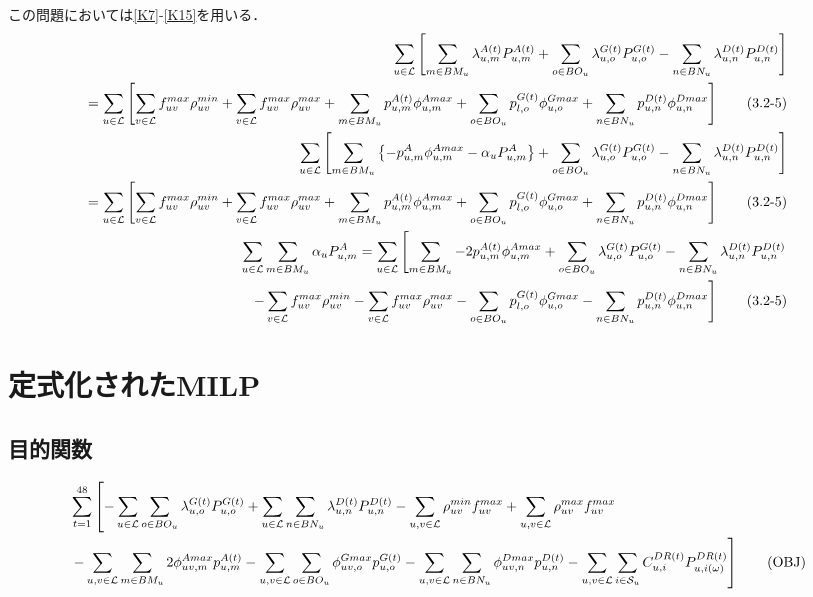 \documentclass[a4j,10.5pt]{jarticle}
\begin{document}
この問題においては\ref{K7}-\ref{K15}を用いる．
\begin{align}
\sum_{u\in \mathcal{L}}\left[\sum_{m\in BM_u}\lambda^{A(t)}_{u,m}P^{A(t)}_{u,m}+\sum_{o\in BO_u}\lambda^{G(t)}_{u,o}P^{G(t)}_{u,o}-\sum_{n\in BN_u}\lambda^{D(t)}_{u,n}P^{D(t)}_{u,n}\right] \notag\\
=\sum_{u\in \mathcal{L}}\left[\sum_{v\in \mathcal{L}}f_{uv}^{max}\rho_{uv}^{min}+\sum_{v\in \mathcal{L}}f_{uv}^{max}\rho_{uv}^{max}+\sum_{m\in BM_u}p_{u,m}^{A(t)}\phi_{u,m}^{Amax}+\sum_{o\in BO_u}p_{l,o}^{G(t)}\phi_{u,o}^{Gmax}+\sum_{n\in BN_u}p_{u,n}^{D(t)}\phi_{u,n}^{Dmax}\right] \tag{3.2-5}\label{3.2-5}\\
\sum_{u\in \mathcal{L}}\left[\sum_{m\in BM_u}\left\{-p_{u,m}^A\phi_{u,m}^{Amax}-\alpha_uP_{u,m}^A\right\}+\sum_{o\in BO_u}\lambda^{G(t)}_{u,o}P^{G(t)}_{u,o}-\sum_{n\in BN_u}\lambda^{D(t)}_{u,n}P^{D(t)}_{u,n}\right] \notag\\
=\sum_{u\in \mathcal{L}}\left[\sum_{v\in \mathcal{L}}f_{uv}^{max}\rho_{uv}^{min}+\sum_{v\in \mathcal{L}}f_{uv}^{max}\rho_{uv}^{max}+\sum_{m\in BM_u}p_{u,m}^{A(t)}\phi_{u,m}^{Amax}+\sum_{o\in BO_u}p_{l,o}^{G(t)}\phi_{u,o}^{Gmax}+\sum_{n\in BN_u}p_{u,n}^{D(t)}\phi_{u,n}^{Dmax}\right] \tag{3.2-5}\label{3.2-5}\\
\sum_{u\in \mathcal{L}}\sum_{m\in BM_u}\alpha_uP_{u,m}^A=\sum_{u\in \mathcal{L}}\left[\sum_{m\in BM_u}-2p_{u,m}^{A(t)}\phi_{u,m}^{Amax}+\sum_{o\in BO_u}\lambda^{G(t)}_{u,o}P^{G(t)}_{u,o}-\sum_{n\in BN_u}\lambda^{D(t)}_{u,n}P^{D(t)}_{u,n}\right.\notag\\
\left.-\sum_{v\in \mathcal{L}}f_{uv}^{max}\rho_{uv}^{min}-\sum_{v\in \mathcal{L}}f_{uv}^{max}\rho_{uv}^{max}-\sum_{o\in BO_u}p_{l,o}^{G(t)}\phi_{u,o}^{Gmax}-\sum_{n\in BN_u}p_{u,n}^{D(t)}\phi_{u,n}^{Dmax}\right] \tag{3.2-5}\label{3.2-5}
\end{align}

\newpage
\section{定式化されたMILP}
\subsection{目的関数}
\begin{align}
&\sum_{t=1}^{48} \left[-\sum_{u\in \mathcal{L}} \sum_{o\in BO_u}\lambda_{u,o}^{G(t)}P_{u,o}^{G(t)}+\sum_{u\in \mathcal{L}} \sum_{n\in BN_u}\lambda_{u,n}^{D(t)}P_{u,n}^{D(t)}-\sum_{u,v\in \mathcal{L}}\rho_{uv}^{min}f_{uv}^{max}+\sum_{u,v\in \mathcal{L}}\rho_{uv}^{max}f_{uv}^{max}
\notag \right. \\
&\left.-\sum_{u,v\in \mathcal{L}} \sum_{m\in BM_u}2\phi_{uv,m}^{Amax}p_{u,m}^{A(t)}-\sum_{u,v\in \mathcal{L}} \sum_{o\in BO_u}\phi_{uv,o}^{Gmax}p_{u,o}^{G(t)}-\sum_{u,v\in \mathcal{L}} \sum_{n\in BN_u}\phi_{uv,n}^{Dmax}p_{u,n}^{D(t)}-\sum_{u,v\in \mathcal{L}}\sum_{i\in \mathcal{S}_u}C_{u,i}^{DR(t)}P_{u,i(\omega)}^{DR(t)}\right]\tag{OBJ}
\end{align}
\end{document}
